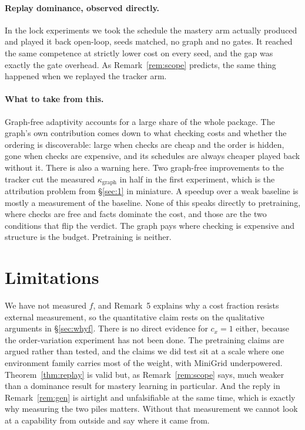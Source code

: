 \documentclass[11pt]{article}
\theoremstyle{plain}
\theoremstyle{definition}
\theoremstyle{remark}
\begin{document}
\paragraph{Replay dominance, observed directly.} In the lock experiments we took the schedule the
mastery arm actually produced and played it back open-loop, seeds matched, no graph and no gates. It
reached the same competence at strictly lower cost on every seed, and the gap was exactly the gate
overhead. As Remark~\ref{rem:scope} predicts, the same thing happened when we replayed the tracker
arm.

\paragraph{What to take from this.} Graph-free adaptivity accounts for a large share of the whole
package. The graph's own contribution comes down to what checking costs and whether the ordering is
discoverable: large when checks are cheap and the order is hidden, gone when checks are expensive,
and its schedules are always cheaper played back without it. There is also a warning here. Two
graph-free improvements to the tracker cut the measured $\kappa_{\mathrm{graph}}$ in half in the
first experiment, which is the attribution problem from \S\ref{sec:1} in miniature. A speedup over a
weak baseline is mostly a measurement of the baseline. None of this speaks directly to pretraining,
where checks are free and facts dominate the cost, and those are the two conditions that flip the
verdict. The graph pays where checking is expensive and structure is the budget. Pretraining is
neither.

\section*{Limitations}

We have not measured $f$, and Remark~5 explains why a cost fraction resists external measurement, so
the quantitative claim rests on the qualitative arguments in \S\ref{sec:whyf}. There is no direct
evidence for $c_x=1$ either, because the order-variation experiment has not been done. The
pretraining claims are argued rather than tested, and the claims we did test sit at a scale where one
environment family carries most of the weight, with MiniGrid underpowered. Theorem~\ref{thm:replay}
is valid but, as Remark~\ref{rem:scope} says, much weaker than a dominance result for mastery
learning in particular. And the reply in Remark~\ref{rem:gen} is airtight and unfalsifiable at the
same time, which is exactly why measuring the two piles matters. Without that measurement we cannot
look at a capability from outside and say where it came from.
\end{document}
